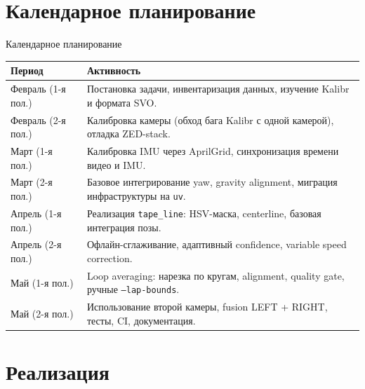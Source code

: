 \documentclass[aspectratio=169]{beamer}
\newcommand{\code}[1]{\texttt{#1}}
\begin{document}
\section{Календарное планирование}

\begin{frame}{Календарное планирование}
    \small
    \begin{table}
        \begin{tabular}{>{\raggedright\arraybackslash}p{} >{\raggedright\arraybackslash}p{}}
            \toprule
            Период & Активность \\
            \midrule
            Февраль (1-я пол.) & Постановка задачи, инвентаризация данных, изучение Kalibr и формата SVO. \\
            Февраль (2-я пол.) & Калибровка камеры (обход бага Kalibr с одной камерой), отладка ZED-stack. \\
            Март (1-я пол.) & Калибровка IMU через AprilGrid, синхронизация времени видео и IMU. \\
            Март (2-я пол.) & Базовое интегрирование yaw, gravity alignment, миграция инфраструктуры на \code{uv}. \\
            Апрель (1-я пол.) & Реализация \code{tape\_line}: HSV-маска, centerline, базовая интеграция позы. \\
            Апрель (2-я пол.) & Офлайн-сглаживание, адаптивный confidence, variable speed correction. \\
            Май (1-я пол.) & Loop averaging: нарезка по кругам, alignment, quality gate, ручные \code{--lap-bounds}. \\
            Май (2-я пол.) & Использование второй камеры, fusion LEFT + RIGHT, тесты, CI, документация. \\
            \bottomrule
        \end{tabular}
    \end{table}
\end{frame}

\section{Реализация}
\end{document}
